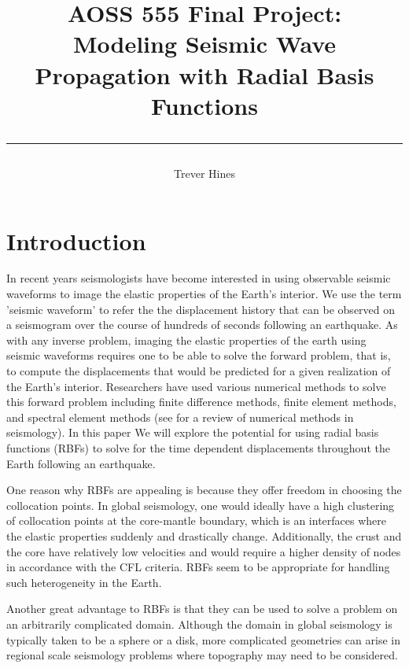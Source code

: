 \documentclass[12pt]{article}
\title{	
AOSS 555 Final Project:\\
Modeling Seismic Wave Propagation with Radial Basis Functions\\
\author{Trever Hines}
\rule{\headwidth}{1.0pt}
}
\begin{document}
\maketitle
\section*{Introduction}
 
In recent years seismologists have become interested in using
observable seismic waveforms to image the elastic properties of the
Earth's interior.  We use the term 'seismic waveform' to refer the the
displacement history that can be observed on a seismogram over the
course of hundreds of seconds following an earthquake.  As with any
inverse problem, imaging the elastic properties of the earth using
seismic waveforms requires one to be able to solve the forward
problem, that is, to compute the displacements that would be predicted for
a given realization of the Earth's interior.  Researchers have used
various numerical methods to solve this forward problem including
finite difference methods, finite element methods, and spectral
element methods (see \citet{F2011} for a review of numerical methods
in seismology).  In this paper We will explore the potential for using
radial basis functions (RBFs) to solve for the time dependent
displacements throughout the Earth following an earthquake.
 
One reason why RBFs are appealing is because they offer freedom in
choosing the collocation points.  In global seismology, one would
ideally have a high clustering of collocation points at the
core-mantle boundary, which is an interfaces where the elastic
properties suddenly and drastically change.  Additionally, the crust
and the core have relatively low velocities and would require a higher
density of nodes in accordance with the CFL criteria.  RBFs seem to be
appropriate for handling such heterogeneity in the Earth.

Another great advantage to RBFs is that they can be used to solve a
problem on an arbitrarily complicated domain.  Although the domain in
global seismology is typically taken to be a sphere or a disk, more
complicated geometries can arise in regional scale seismology problems
where topography may need to be considered.
\end{document}
